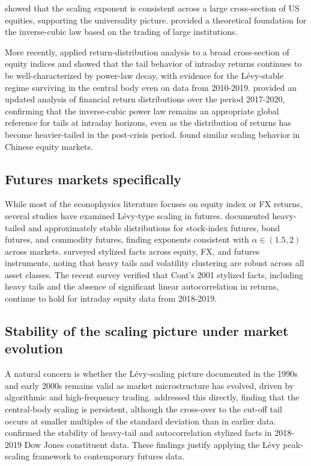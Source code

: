 \documentclass[12pt,a4paper]{article}
\begin{document}
\textcite{Plerou1999} showed that the scaling exponent is consistent across
a large cross-section of US equities, supporting the universality picture.
\textcite{Gabaix2003} provided a theoretical foundation for the inverse-cubic
law based on the trading of large institutions.

More recently, \textcite{Kadioglu2021} applied return-distribution analysis to
a broad cross-section of equity indices and showed that the tail behavior of
intraday returns continues to be well-characterized by power-law decay, with
evidence for the Lévy-stable regime surviving in the central body even on
data from 2010-2019. \textcite{Masoliver2021} provided an updated analysis of
financial return distributions over the period 2017-2020, confirming that the
inverse-cubic power law remains an appropriate global reference for tails at
intraday horizons, even as the distribution of returns has become heavier-tailed
in the post-crisis period. \textcite{Jiang2019} found similar scaling behavior
in Chinese equity markets.

\subsection{Futures markets specifically}

While most of the econophysics literature focuses on equity index or FX
returns, several studies have examined Lévy-type scaling in futures.
\textcite{Bouchaud2002} documented heavy-tailed and approximately stable
distributions for stock-index futures, bond futures, and commodity futures,
finding exponents consistent with $\alpha \in (1.5, 2)$ across markets.
\textcite{Cont2001} surveyed stylized facts across equity, FX, and futures
instruments, noting that heavy tails and volatility clustering are robust
across all asset classes. The recent survey \textcite{ContMiami2023}
verified that Cont's 2001 stylized facts, including heavy tails and the
absence of significant linear autocorrelation in returns, continue to hold
for intraday equity data from 2018-2019.

\subsection{Stability of the scaling picture under market evolution}

A natural concern is whether the Lévy-scaling picture documented in the 1990s
and early 2000s remains valid as market microstructure has evolved, driven by
algorithmic and high-frequency trading. \textcite{Masoliver2021} addressed this
directly, finding that the central-body scaling is persistent, although the
cross-over to the cut-off tail occurs at smaller multiples of the standard
deviation than in earlier data. \textcite{ContMiami2023} confirmed the
stability of heavy-tail and autocorrelation stylized facts in 2018-2019 Dow
Jones constituent data. These findings justify applying the Lévy peak-scaling
framework to contemporary futures data.
\end{document}
